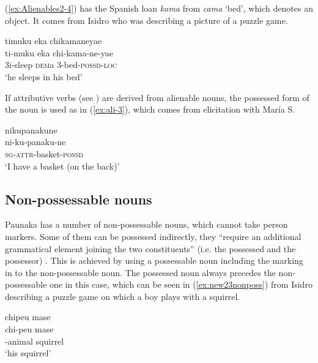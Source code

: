 (\ref{ex:Alienables2-4}) has the Spanish loan \textit{kama} from \textit{cama} ‘bed’, which denotes an object. It comes from Isidro who was describing a picture of a puzzle game.

\ea\label{ex:Alienables2-4}
\begingl 
\glpreamble timuku eka chikamaneyae\\
\gla ti-muku eka chi-kama-ne-yae\\ 
\glb 3i-sleep \textsc{dem}a 3-bed-\textsc{possd}-\textsc{loc}\\ 
\glft ‘he sleeps in his bed’\\ 
\endgl
\trailingcitation{[dxx-d120416s.002]}
\xe

If attributive verbs (see ) are derived from alienable nouns, the possessed form of the noun is used as in (\ref{ex:ali-3}), which comes from elicitation with María S.

\ea\label{ex:ali-3}
\begingl
\glpreamble nikupanakune\\
\gla ni-ku-panaku-ne\\
\textsc{sg}-\textsc{attr}-basket-\textsc{possd}\\
\glft ‘I have a basket (on the back)’
\endgl
\trailingcitation{[rxx-e181020le]}
\xe
{}
 
\subsection{Non-possessable nouns}\label{sec:Non-possessables}

Paunaka has a number of non-possessable nouns, which cannot take person markers. Some of them can be possessed indirectly, they “require an additional grammatical element joining the two constituents” (i.e. the possessed and the possessor) \citep[58]{Krasnoukhova2012}. This is achieved by using a possessable noun including the  marking in  to the non-possessable noun. The possessed noun always precedes the non-possessable one in this case, which can be seen in (\ref{ex:new23nonposs}) from Isidro describing a puzzle game on which a boy plays with a squirrel. 

\ea\label{ex:new23nonposs}
\begingl
\glpreamble chipeu mase\\
\gla chi-peu mase\\
-animal squirrel\\
\glft ‘his squirrel’
\endgl
\trailingcitation{[mdx-c120416ls.177]}
\xe


